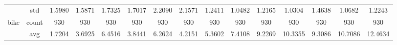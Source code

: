 \begin{table}[htbp]
{\begin{tabular}{rcccc|c|c|c|c|c|ccccc}
			                                                                               & std                                    & 1.5980                                                                             & 1.5871                                                                    & 1.7325                                                                    & 1.7017                                         & 2.2090                                                                    & 2.1571                                       & 1.2411                                      & 1.0482                                         & 1.2165                                         & 1.0304                                          & 1.4638                                          & 1.0682                                         & 1.2243                                         \\
			bike                                                                           & count                                  & 930                                                                                & 930                                                                       & 930                                                                       & 930                                            & 930                                                                       & 930                                          & 930                                         & 930                                            & 930                                            & 930                                             & 930                                             & 930                                            & 930                                            \\
			                                                                               & avg                                    & \cellcolor[rgb]{ .776,  .937,  .808}\textcolor[rgb]{ 0,  .38,  0}{1.7204}          & 3.6925                                                                    & 6.4516                                                                    & 3.8441                                         & 6.2624                                                                    & 4.2151                                       & 5.3602                                      & 7.4108                                         & 9.2269                                         & 10.3355                                         & 9.3086                                          & 10.7086                                        & 12.4634                                        \\

\end{tabular}}
\end{table}
